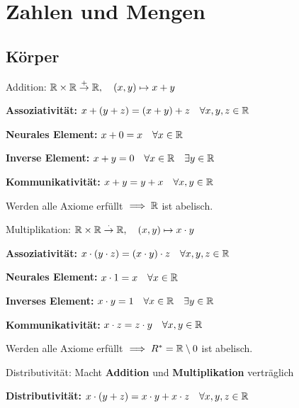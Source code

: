 
\section{Zahlen und Mengen}

\subsection{Körper}
\begin{compactdesc}
    \item[Addition:] $\mathbb{R} \times \mathbb{R} \overset{+}{\to} \mathbb{R}, \quad (x, y) \mapsto x + y$
        \begin{compactenum}[{A}.1]
            \item \textbf{Assoziativität:} $x + \left( y + z \right) = \left( x + y \right) + z  \quad \forall x,y,z \in \mathbb{R}$
            \item \textbf{Neurales Element:} $x + 0 = x \quad \forall x \in \mathbb{R}$
            \item \textbf{Inverse Element:} $x + y = 0 \quad  \forall x \in \mathbb{R} \quad \exists y \in \mathbb{R}$
            \item \textbf{Kommunikativität:} $x + y = y + x \quad \forall x,y \in  \mathbb{R}$
        \end{compactenum}
     Werden alle Axiome erfüllt $\implies \mathbb{R}$ ist abelisch.
 \item[Multiplikation:] $\mathbb{R} \times \mathbb{R} \overset{\cdot}{\to} \mathbb{R}, \quad (x, y) \mapsto x \cdot y$
        \begin{compactenum}[{M}.1]
            \item \textbf{Assoziativität:} $x \cdot \left( y \cdot z \right) = \left( x \cdot y \right) \cdot z \quad \forall x,y,z \in \mathbb{R}$
            \item \textbf{Neurales Element:} $x \cdot  1 = x \quad \forall x \in \mathbb{R}$
            \item \textbf{Inverses Element:} $x \cdot y = 1 \quad \forall  x \in \mathbb{R} \quad \exists y \in \mathbb{R}$
            \item \textbf{Kommunikativität:} $x \cdot z = z \cdot y \quad \forall x,y \in \mathbb{R}$
        \end{compactenum}
    Werden alle Axiome erfüllt $\implies R^* = \mathbb{R} \setminus 0$ ist abelisch.
    \item[Distributivität:] Macht \textbf{Addition} und \textbf{Multiplikation} verträglich
        \begin{compactenum}[{D}.1]
            \item \textbf{Distributivität:} $x \cdot \left( y + z \right) = x \cdot y + x \cdot z \quad \forall x,y,z \in \mathbb{R}$

\end{compactenum}
\end{compactdesc}
